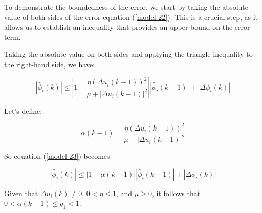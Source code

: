 \documentclass[journal,onecolumn]{IEEEtran}
\begin{document}




To demonstrate the boundedness of the error, we start by taking the absolute value of both sides of the error equation (\ref{model 22}). This is a crucial step, as it allows us to establish an inequality that provides an upper bound on the error term.

Taking the absolute value on both sides and applying the triangle inequality to the right-hand side, we have:

\begin{equation}
\label{model 23}
|\tilde{\phi_i}(k)| \leq \left| 1 - \frac{\eta (\Delta u_i(k-1))^2}{\mu + |\Delta u_i(k-1)|^2} \right| |\tilde{\phi_i}(k-1)| + |\Delta \phi_i(k)|
\end{equation}

Let’s define:

\begin{equation}
\label{model 24}
\alpha(k-1) = \frac{\eta (\Delta u_i(k-1))^2}{\mu + |\Delta u_i(k-1)|^2}
\end{equation}

So equation (\ref{model 23}) becomes:

\begin{equation}
\label{model 25}
|\tilde{\phi_i}(k)| \leq |1 - \alpha(k-1)| |\tilde{\phi_i}(k-1)| + |\Delta \phi_i(k)|
\end{equation}

Given that \(\Delta u_i(k) \neq 0\), \(0 < \eta \leq 1\), and \(\mu \geq 0\), it follows that \(0 < \alpha(k-1) \leq q_1 < 1\).
\end{document}
